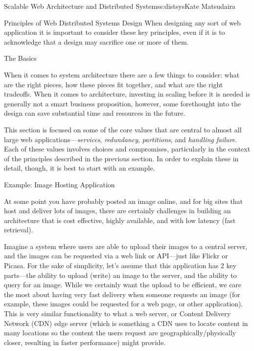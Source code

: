 \begin{aosachapter}{Scalable Web Architecture and Distributed Systems}{s:distsys}{Kate Matsudaira}
\begin{aosasect1}{Principles of Web Distributed Systems Design}
When designing any sort of web application it is
important to consider these key principles, even if it is to
acknowledge that a design may sacrifice one or more of them.

\end{aosasect1}

\begin{aosasect1}{The Basics}

When it comes to system architecture there are a few things to
consider: what are the right pieces, how these pieces fit together,
and what are the right tradeoffs. When it comes to architecture,
investing in scaling before it is needed is generally not a smart
business proposition, however, some forethought into the design can
save substantial time and resources in the future.

This section is focused on some of the core values that are central to
almost all large web applications---\emph{services},
\emph{redundancy}, \emph{partitions}, and \emph{handling
failure}. Each of these values involves choices and compromises,
particularly in the context of the principles described in the
previous section. In order to explain these in detail, though, it is
best to start with an example.

\begin{aosasect2}{Example: Image Hosting Application}

At some point you have probably posted an image online, and for big
sites that host and deliver lots of images, there are certainly
challenges in building an architecture that is cost effective, highly
available, and with low latency (fast retrieval).

Imagine a system where users are able to upload their images to a
central server, and the images can be requested via a web link or
API---just like Flickr or Picasa. For the sake of simplicity, let's
assume that this application has 2 key parts---the ability to upload
(write) an image to the server, and the ability to query for an
image. While we certainly want the upload to be efficient, we care the
most about having very fast delivery when someone requests an image
(for example, these images could be requested for a web page, or other
application). This is very similar functionality to what a web server,
or Content Delivery Network (CDN) edge server (which is something a
CDN uses to locate content in many locations so the content the users
request are geographically/physically closer, resulting in faster
performance) might provide.


\end{aosasect2}
\end{aosasect1}
\end{aosachapter}
